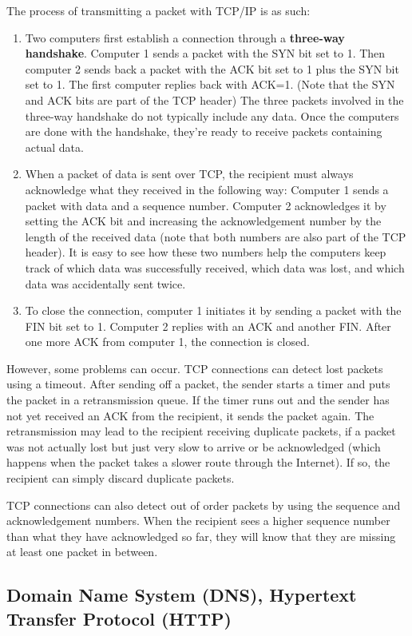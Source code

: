\documentclass[a4paper, 12pt]{report}
\theoremstyle{remark}
\theoremstyle{definition}
\begin{document}
The process of transmitting a packet with TCP/IP is as such:
\begin{enumerate}
    \item Two computers first establish a connection through a \textbf{three-way handshake}. Computer 1 sends a packet with the SYN bit set to 1. Then computer 2 sends back a packet with the ACK bit set to 1 plus the SYN bit set to 1. The first computer replies back with ACK=1. (Note that the SYN and ACK bits are part of the TCP header) The three packets involved in the three-way handshake do not typically include any data. Once the computers are done with the handshake, they're ready to receive packets containing actual data.
    \item When a packet of data is sent over TCP, the recipient must always acknowledge what they received in the following way: Computer 1 sends a packet with data and a sequence number. Computer 2 acknowledges it by setting the ACK bit and increasing the acknowledgement number by the length of the received data (note that both numbers are also part of the TCP header). It is easy to see how these two numbers help the computers keep track of which data was successfully received, which data was lost, and which data was accidentally sent twice. 
    \item To close the connection, computer 1 initiates it by sending a packet with the FIN bit set to 1. Computer 2 replies with an ACK and another FIN. After one more ACK from computer 1, the connection is closed. 
\end{enumerate}

However, some problems can occur. TCP connections can detect lost packets using a timeout. After sending off a packet, the sender starts a timer and puts the packet in a retransmission queue. If the timer runs out and the sender has not yet received an ACK from the recipient, it sends the packet again. The retransmission may lead to the recipient receiving duplicate packets, if a packet was not actually lost but just very slow to arrive or be acknowledged (which happens when the packet takes a slower route through the Internet). If so, the recipient can simply discard duplicate packets. 

TCP connections can also detect out of order packets by using the sequence and acknowledgement numbers. When the recipient sees a higher sequence number than what they have acknowledged so far, they will know that they are missing at least one packet in between.

\subsection{Domain Name System (DNS), Hypertext Transfer Protocol (HTTP)}
\end{document}
